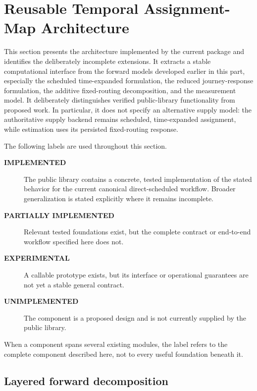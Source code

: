\section{Reusable Temporal Assignment-Map Architecture}
\label{sec:planned-temporal-assignment-map}

This section presents the architecture implemented by the current package and
identifies the deliberately incomplete extensions.  It extracts a stable
computational interface from the forward models developed earlier in this
part, especially the scheduled time-expanded formulation, the reduced
journey-response formulation, the additive fixed-routing decomposition, and
the measurement model.  It deliberately distinguishes verified
public-library functionality from proposed work.  In particular, it does not
specify an alternative supply model: the authoritative supply backend remains
scheduled, time-expanded assignment, while estimation uses its persisted
fixed-routing response.

The following labels are used throughout this section.
\begin{description}
\item[\textbf{IMPLEMENTED}] The public library contains a concrete, tested
  implementation of the stated behavior for the current canonical
  direct-scheduled workflow.  Broader generalization is stated explicitly
  where it remains incomplete.
\item[\textbf{PARTIALLY IMPLEMENTED}] Relevant tested foundations exist, but
  the complete contract or end-to-end workflow specified here does not.
\item[\textbf{EXPERIMENTAL}] A callable prototype exists, but its interface or
  operational guarantees are not yet a stable general contract.
\item[\textbf{UNIMPLEMENTED}] The component is a proposed design and is not
  currently supplied by the public library.
\end{description}
When a component spans several existing modules, the label refers to the
complete component described here, not to every useful foundation beneath it.

\subsection{Layered forward decomposition}

